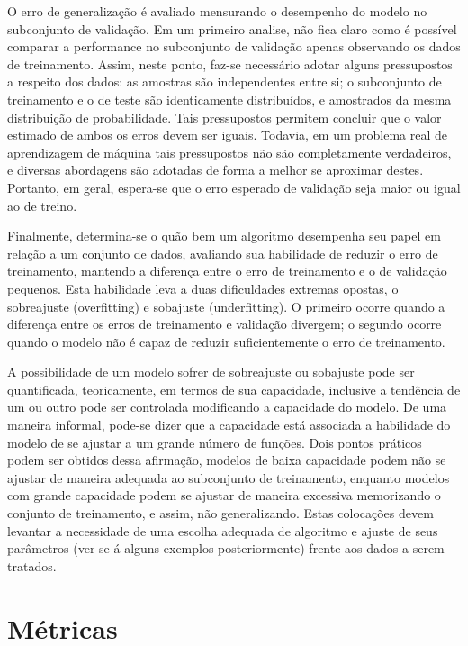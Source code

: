O erro de generalização é avaliado mensurando o desempenho do modelo no subconjunto de validação. Em um primeiro analise, não fica claro como é possível comparar a performance no subconjunto de validação apenas observando os dados de treinamento. Assim, neste ponto, faz-se necessário adotar alguns pressupostos a respeito dos dados: as amostras são independentes entre si; o subconjunto de treinamento e o de teste são identicamente distribuídos, e amostrados da mesma distribuição de probabilidade. Tais pressupostos permitem concluir que o valor estimado de ambos os erros devem ser iguais. Todavia, em um problema real de aprendizagem de máquina tais pressupostos não são completamente verdadeiros, e diversas abordagens são adotadas de forma a melhor se aproximar destes. Portanto, em geral, espera-se que o erro esperado de validação seja maior ou igual ao de treino.

Finalmente, determina-se o quão bem um algoritmo desempenha seu papel em relação a um conjunto de dados, avaliando sua habilidade de reduzir o erro de treinamento, mantendo a diferença entre o erro de treinamento e o de validação pequenos. Esta habilidade leva a duas dificuldades extremas opostas, o sobreajuste (overfitting) e sobajuste (underfitting). O primeiro ocorre quando a diferença entre os erros de treinamento e validação divergem; o segundo ocorre quando o modelo não é capaz de reduzir suficientemente o erro de treinamento.

A possibilidade de um modelo sofrer de sobreajuste ou sobajuste pode ser quantificada, teoricamente, em termos de sua capacidade, inclusive a tendência de um ou outro pode ser controlada modificando a capacidade do modelo. De uma maneira informal, pode-se dizer que a capacidade está associada a habilidade do modelo de se ajustar a um grande número de funções. Dois pontos práticos podem ser obtidos dessa afirmação, modelos de baixa capacidade podem não se ajustar de maneira adequada ao subconjunto de treinamento, enquanto modelos com grande capacidade podem se ajustar de maneira excessiva memorizando o conjunto de treinamento, e assim, não generalizando. Estas colocações devem levantar a necessidade de uma escolha adequada de algoritmo e ajuste de seus parâmetros (ver-se-á alguns exemplos posteriormente) frente aos dados a serem tratados.

\section{Métricas}


